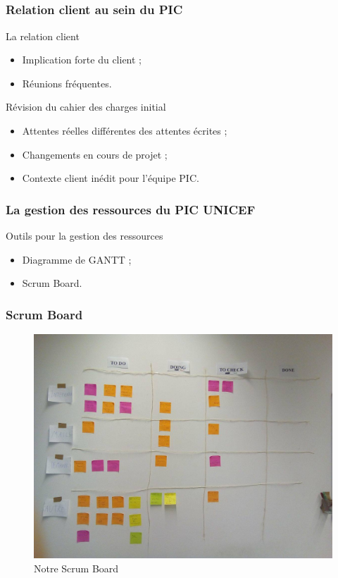 \speaker{\Pierre}
\subsection{} %

\begin{frame}
\frametitle{Relation client au sein du PIC}
	\begin{block}{La relation client}
		\begin{itemize}
			\item Implication forte du client ;
			\item Réunions fréquentes.
		\end{itemize}      
	\end{block}
	\begin{block}{Révision du cahier des charges initial}
		\begin{itemize}
			\item Attentes réelles différentes des attentes écrites ;
			\item Changements en cours de projet ;
			\item Contexte client inédit pour l'équipe PIC.
		\end{itemize}      
	\end{block}
\end{frame}


\begin{frame}
\frametitle{La gestion des ressources du PIC UNICEF}
	\begin{block}{Outils pour la gestion des ressources}
		\begin{itemize}
			\item Diagramme de GANTT ;
			\item Scrum Board.
		\end{itemize}      
	\end{block}
\end{frame}


\begin{frame}
\frametitle{Scrum Board}
	\begin{figure}
		\includegraphics[scale=0.2]{images/kanban.jpg}
		\caption{Notre Scrum Board}
		\label{Kn}
	\end{figure}
\end{frame}
	


